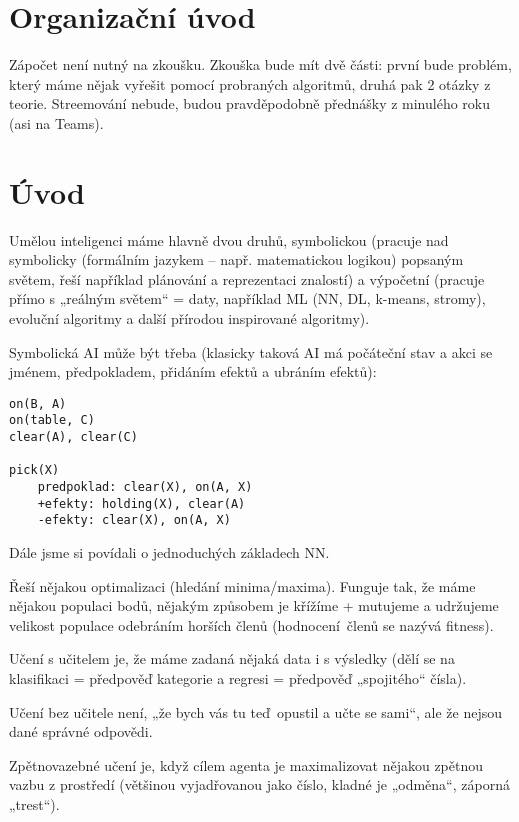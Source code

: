 \documentclass[12pt]{article}					%
\begin{document}

\section*{Organizační úvod}
\begin{poznamka}
	Zápočet není nutný na zkoušku. Zkouška bude mít dvě části: první bude problém, který máme nějak vyřešit pomocí probraných algoritmů, druhá pak 2 otázky z teorie. Streemování nebude, budou pravděpodobně přednášky z minulého roku (asi na Teams).
\end{poznamka}

\section{Úvod}
\begin{definice}[AI]
	Umělou inteligenci máme hlavně dvou druhů, symbolickou (pracuje nad symbolicky (formálním jazykem – např. matematickou logikou) popsaným světem, řeší například plánování a reprezentaci znalostí) a výpočetní (pracuje přímo s „reálným světem“ = daty, například ML (NN, DL, k-means, stromy), evoluční algoritmy a další přírodou inspirované algoritmy).

	Symbolická AI může být třeba (klasicky taková AI má počáteční stav a akci se jménem, předpokladem, přidáním efektů a ubráním efektů):
	\begin{verbatim}
on(B, A)
on(table, C)
clear(A), clear(C)

pick(X)
	predpoklad: clear(X), on(A, X)
	+efekty: holding(X), clear(A)
	-efekty: clear(X), on(A, X)
	\end{verbatim}
\end{definice}

\begin{poznamka}
	Dále jsme si povídali o jednoduchých základech NN.
\end{poznamka}

\begin{definice}
	Řeší nějakou optimalizaci (hledání minima/maxima). Funguje tak, že máme nějakou populaci bodů, nějakým způsobem je křížíme + mutujeme a udržujeme velikost populace odebráním horších členů (hodnocení členů se nazývá fitness).
\end{definice}

\begin{definice}
	Učení s učitelem je, že máme zadaná nějaká data i s výsledky (dělí se na klasifikaci = předpověď kategorie a regresi = předpověď „spojitého“ čísla).

	Učení bez učitele není, „že bych vás tu teď opustil a učte se sami“, ale že nejsou dané správné odpovědi.

	Zpětnovazebné učení je, když cílem agenta je maximalizovat nějakou zpětnou vazbu z prostředí (většinou vyjadřovanou jako číslo, kladné je „odměna“, záporná „trest“).
\end{definice}
\end{document}
